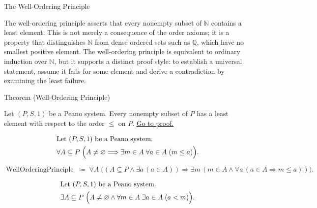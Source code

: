 \label{sec:well-ordering-principle}

\begin{topicbox}{The Well-Ordering Principle}
\begin{exposition}
The well-ordering principle asserts that every nonempty subset of $\mathbb{N}$
contains a least element. This is not merely a consequence of the order axioms;
it is a property that distinguishes $\mathbb{N}$ from dense ordered sets such
as $\mathbb{Q}$, which have no smallest positive element. The well-ordering
principle is equivalent to ordinary induction over $\mathbb{N}$, but it
supports a distinct proof style: to establish a universal statement, assume
it fails for some element and derive a contradiction by examining the least
failure.
\end{exposition}

\begin{theorembox}{Theorem (Well-Ordering Principle)}
\begin{theorem}
\label{thm:well-ordering-principle}
Let $(P,S,1)$ be a Peano system. Every nonempty subset of $P$ has a least
element with respect to the order $\le$ on $P$.
\hyperref[prf:well-ordering-principle]{Go to proof.}
\end{theorem}
\end{theorembox}

\begin{remark*}
\[
\begin{aligned}
&\text{Let } (P,S,1) \text{ be a Peano system.}\\
&\forall A \subseteq P\;
\Bigl(A \neq \varnothing \Longrightarrow
\exists m \in A\;\forall a \in A\;(m \le a)\Bigr).
\end{aligned}
\]
\end{remark*}

\begin{remark*}
\[
\operatorname{WellOrderingPrinciple}
\;\coloneqq\;
\forall A\;\bigl((A \subseteq P \land \exists a\,(a \in A))
\Rightarrow \exists m\,(m \in A \land \forall a\,(a \in A \Rightarrow m \le a))\bigr).
\]
\end{remark*}

\begin{remark*}
\[
\begin{aligned}
&\text{Let } (P,S,1) \text{ be a Peano system.}\\
&\exists A \subseteq P\;
\Bigl(A \neq \varnothing \land
\forall m \in A\;\exists a \in A\;(a < m)\Bigr).
\end{aligned}
\]
\end{remark*}


\end{topicbox}
